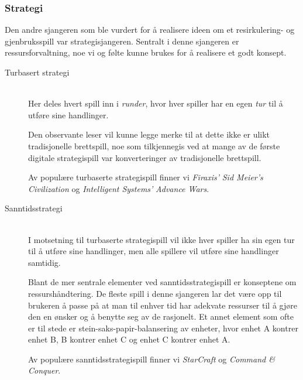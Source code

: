 


\subsubsection{Strategi}
Den andre sjangeren som ble vurdert for å realisere ideen om et resirkulering- og gjenbruksspill var strategisjangeren. Sentralt i denne sjangeren er ressursforvaltning, noe vi og følte kunne brukes for å realisere et godt konsept.

\begin{description}

	\item[Turbasert strategi] \hfill \\
	Her deles hvert spill inn i \emph{runder}, hvor hver spiller har en egen \emph{tur} til å utføre sine handlinger.


	Den observante leser vil kunne legge merke til at dette ikke er ulikt tradisjonelle brettspill, noe som tilkjennegis ved at mange av de første digitale strategispill var konverteringer av tradisjonelle brettspill.

	Av populære turbaserte strategispill finner vi \emph{Firaxis'} \emph{Sid Meier's Civilization} og \emph{Intelligent Systems'} \emph{Advance Wars}. %


	\item[Sanntidsstrategi] \hfill \\
	
I motsetning til turbaserte strategispill vil ikke hver spiller ha sin egen tur til å utføre sine handlinger, men alle spillere vil utføre sine handlinger samtidig.

Blant de mer sentrale elementer ved sanntidsstrategispill er konseptene om ressurshåndtering. De fleste spill i denne sjangeren lar det være opp til brukeren å passe på at man til enhver tid har adekvate ressurser til å gjøre den en ønsker og å benytte seg av de rasjonelt. Et annet element som ofte er til stede er stein-saks-papir-balansering av enheter, hvor enhet A kontrer enhet B, B kontrer enhet C og enhet C kontrer enhet A.

	Av populære sanntidsstrategispill finner vi \emph{StarCraft} og \emph{Command \& Conquer}.

\end{description}

